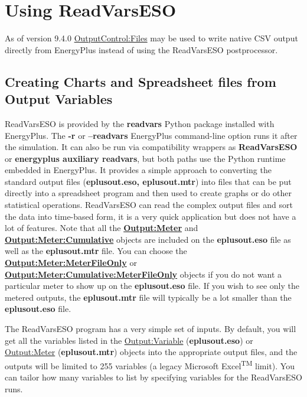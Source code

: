 \section{Using ReadVarsESO}\label{using-readvarseso}
As of version 9.4.0 \hyperref[outputcontrolfiles]{OutputControl:Files} may be used to write native CSV output directly from EnergyPlus instead of using the ReadVarsESO postprocessor.

\subsection{Creating Charts and Spreadsheet files from Output Variables}\label{creating-charts-and-spreadsheet-files-from-output-variables}

ReadVarsESO is provided by the \textbf{readvars} Python package installed with EnergyPlus. The \textbf{-r} or \textbf{--readvars} EnergyPlus command-line option runs it after the simulation. It can also be run via compatibility wrappers as \textbf{ReadVarsESO} or \textbf{energyplus auxiliary readvars}, but both paths use the Python runtime embedded in EnergyPlus. It provides a simple approach to converting the standard output files (\textbf{eplusout.eso, eplusout.mtr}) into files that can be put directly into a spreadsheet program and then used to create graphs or do other statistical operations. ReadVarsESO can read the complex output files and sort the data into time-based form, it is a very quick application but does not have a lot of features. Note that all the \textbf{\hyperref[outputmeter-and-outputmetermeterfileonly]{Output:Meter}} and \textbf{\hyperref[outputmetercumulative-and-outputmetercumulativemeterfileonly]{Output:Meter:Cumulative}} objects are included on the \textbf{eplusout.eso} file as well as the \textbf{eplusout.mtr} file. You can choose the \textbf{\hyperref[outputmeter-and-outputmetermeterfileonly]{Output:Meter:MeterFileOnly}} or \textbf{\hyperref[outputmetercumulative-and-outputmetercumulativemeterfileonly]{Output:Meter:Cumulative:MeterFileOnly}} objects if you do not want a particular meter to show up on the \textbf{eplusout.eso} file. If you wish to see only the metered outputs, the \textbf{eplusout.mtr} file will typically be a lot smaller than the \textbf{eplusout.eso} file.

The ReadVarsESO program has a very simple set of inputs. By default, you will get all the variables listed in the \hyperref[outputvariable]{Output:Variable} (\textbf{eplusout.eso}) or \hyperref[outputmeter-and-outputmetermeterfileonly]{Output:Meter} (\textbf{eplusout.mtr}) objects into the appropriate output files, and the outputs will be limited to 255 variables (a legacy Microsoft Excel\textsuperscript{TM} limit). You can tailor how many variables to list by specifying variables for the ReadVarsESO runs.

